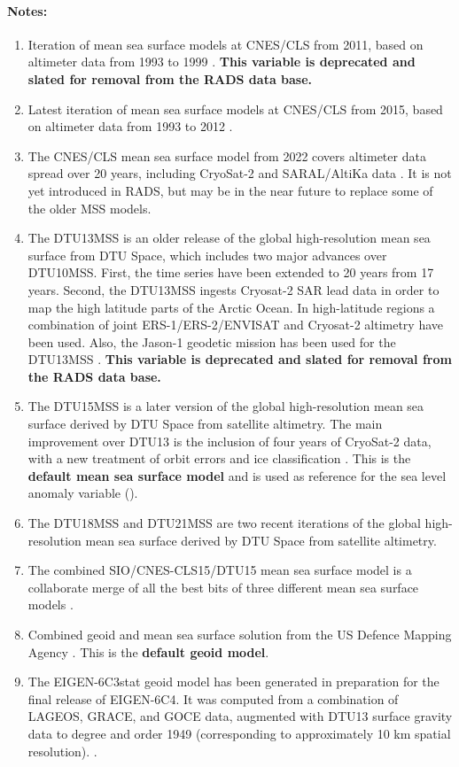 \documentclass[a4paper,11pt,openany,natbib,nomargin]{thesis}
\newcommand\deprecated[1][This variable is]{\textbf{#1 deprecated and slated for removal from the RADS data base.}}
\newenvironment{notes}[1][Notes:]{\FloatBarrier\paragraph{#1}\begin{enumerate}}{\end{enumerate}}
\begin{document}
\begin{notes}
\item Iteration of mean sea surface models at CNES/CLS from 2011, based on altimeter data from 1993 to 1999 \citep{schaeffer2012}. \deprecated\label{item:mss_cnescls11}
\item Latest iteration of mean sea surface models at CNES/CLS from 2015, based on altimeter data from 1993 to 2012 \citep{schaeffer2012}.\label{item:mss_cnescls15}
\item The CNES/CLS mean sea surface model from 2022 covers altimeter data spread over 20 years, including CryoSat-2 and SARAL/AltiKa data \citep{schaeffer2023}. It is not yet introduced in RADS, but may be in the near future to replace some of the older MSS models.\label{item:mss_cnescls22}
\item The DTU13MSS is an older release of the global high-resolution mean sea surface from DTU Space, which includes two major advances over DTU10MSS. First, the time series have been extended to 20 years from 17 years. Second, the DTU13MSS ingests Cryosat-2 SAR lead data in order to map the high latitude parts of the Arctic Ocean. In high-latitude regions a combination of joint ERS-1/ERS-2/ENVISAT and Cryosat-2 altimetry have been used. Also, the Jason-1 geodetic mission has been used for the DTU13MSS \citep{andersen2013a}. \deprecated\label{item:mss_dtu13}
\item The DTU15MSS is a later version of the global high-resolution mean sea surface derived by DTU Space from satellite altimetry. The main improvement over DTU13 is the inclusion of four years of CryoSat-2 data, with a new treatment of orbit errors and ice classification \citep{stenseng2015}. This is the \textbf{default mean sea surface model} and is used as reference for the sea level anomaly variable ().\label{item:mss_dtu15}
\item The DTU18MSS \citep{andersen2018} and DTU21MSS \citep{andersen2023} are two recent iterations of the global high-resolution mean sea surface derived by DTU Space from satellite altimetry.\label{item:mss_dtu18}\label{item:mss_dtu21}
\item The combined SIO/CNES-CLS15/DTU15 mean sea surface model is a collaborate merge of all the best bits of three different mean sea surface models \citep{aviso2021}.\label{item:mss_comb15}
\item Combined geoid and mean sea surface solution from the US Defence Mapping Agency \citep{pavlis2012}. This is the \textbf{default geoid model}.\label{item:geoid_egm2008}
\item The EIGEN-6C3stat geoid model has been generated in preparation for the final release of EIGEN-6C4. It was computed from a combination of LAGEOS, GRACE, and GOCE data, augmented with DTU13 surface gravity data to degree and order 1949 (corresponding to approximately 10 km spatial resolution). \citep{foerste2013,shako2014}.\label{item:geoid_eigen6}
\end{notes}
\end{document}
